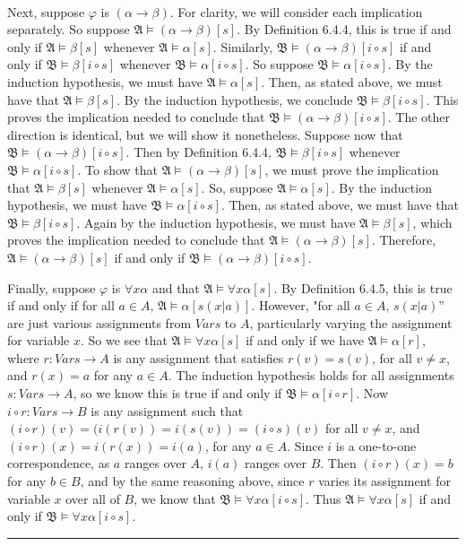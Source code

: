 \documentclass[11pt]{hmcpset}
\newenvironment{problem1}[1]{\noindent {\bf Problem #1}}
{\medskip}
\newenvironment{proof}{\noindent {\bf Proof:} \\}{\hfill
\rule{1mm}{3mm} \bigskip}
\begin{document}
\begin{problem1}{2. (a)}
\begin{proof}
Next, suppose $\varphi$ is $(\alpha\to\beta)$. For clarity, we will consider each implication separately. So suppose $\mathfrak{A}\vDash (\alpha\to\beta)[s]$. By Definition 6.4.4, this is true if and only if  $\mathfrak{A}\vDash\beta [s]$ whenever $\mathfrak{A}\vDash\alpha [s]$. Similarly, $\mathfrak{B}\vDash (\alpha\to\beta) [i \circ s]$ if and only if $\mathfrak{B}\vDash\beta [i \circ s]$ whenever $\mathfrak{B}\vDash\alpha [i\circ s]$. So suppose $\mathfrak{B}\vDash\alpha [i\circ s]$. By the induction hypothesis, we must have $\mathfrak{A}\vDash\alpha [s]$. Then, as stated above, we must have that $\mathfrak{A}\vDash\beta [s]$. By the induction hypothesis, we conclude $\mathfrak{B}\vDash\beta [i\circ s]$. This proves the implication needed to conclude that $\mathfrak{B}\vDash (\alpha\to\beta)[i\circ s]$. The other direction is identical, but we will show it nonetheless. Suppose now that $\mathfrak{B}\vDash (\alpha\to\beta)[i\circ s]$. Then by Definition 6.4.4, $\mathfrak{B}\vDash\beta [i\circ s]$ whenever $\mathfrak{B}\vDash\alpha [i\circ s]$. To show that $\mathfrak{A}\vDash (\alpha\to\beta)[s]$, we must prove the implication that $\mathfrak{A}\vDash\beta [s]$ whenever $\mathfrak{A}\vDash\alpha [s]$. So, suppose $\mathfrak{A}\vDash\alpha[s]$. By the induction hypothesis, we must have $\mathfrak{B}\vDash\alpha[i\circ s]$. Then, as stated above, we must have that $\mathfrak{B}\vDash\beta [i\circ s]$. Again by the induction hypothesis, we must have $\mathfrak{A}\vDash\beta [s]$, which proves the implication needed to conclude that $\mathfrak{A}\vDash (\alpha\to\beta) [s]$. Therefore, $\mathfrak{A}\vDash (\alpha\to\beta) [s]$ if and only if $\mathfrak{B}\vDash (\alpha\to\beta) [i\circ s]$.

Finally, suppose $\varphi$ is $\forall x\alpha$ and that $\mathfrak{A}\vDash\forall x\alpha[s]$. By Definition 6.4.5, this is true if and only if for all $a\in A$, $\mathfrak{A}\vDash\alpha [s(x|a)]$. However, "for all $a\in A$, $s(x|a)$'' are just various assignments from $Vars$ to $A$, particularly varying the assignment for variable $x$. So we see that $\mathfrak{A}\vDash\forall x\alpha[s]$ if and only if we have $\mathfrak{A}\vDash\alpha [r]$, where $r:Vars\to A$ is any assignment that satisfies $r(v)=s(v)$, for all $v\ne x$, and $r(x)=a$ for any $a\in A$. The induction hypothesis holds for all assignments $s:Vars\to A$, so we know this is true if and only if $\mathfrak{B}\vDash\alpha[i\circ r]$. Now $i\circ r:Vars\to B$ is any assignment such that $(i\circ r)(v)=(i( r(v))=i(s(v))=(i\circ s)(v)$ for all $v\ne x$, and $(i\circ r)(x)=i(r(x))=i(a)$, for any $a\in A$. Since $i$ is a one-to-one correspondence, as $a$ ranges over $A$, $i(a)$ ranges over $B$. Then $(i\circ r)(x) =b$ for any $b\in B$, and by the same reasoning above, since $r$ varies its assignment for variable $x$ over all of $B$, we know that $\mathfrak{B}\vDash\forall x\alpha[i\circ s]$. Thus $\mathfrak{A}\vDash\forall x\alpha[s]$ if and only if $\mathfrak{B}\vDash\forall x\alpha[i\circ s]$.


\end{proof}
\end{problem1}
\end{document}
